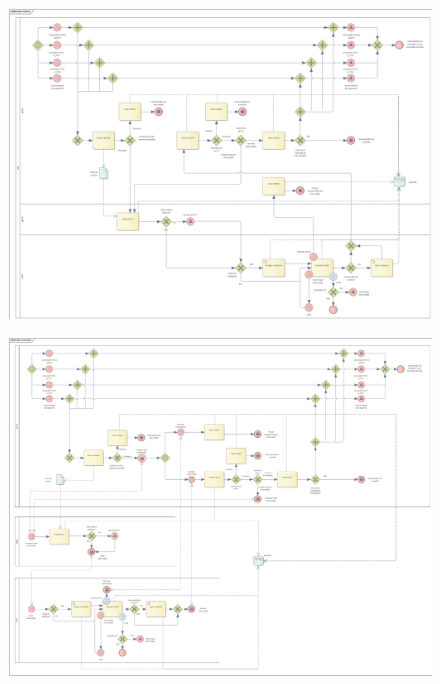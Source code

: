 \documentclass{article}
\begin{document}
    \pagebreak
    \begin{figure}[H]
        \centering
        \vspace*{-1.4cm}
        \hspace*{-1.2cm}
        \includegraphics[angle=-90,origin=c, scale=0.50]{BPMN_One_Pool.png}
    \end{figure}
%
    \pagebreak
    \begin{figure}[H]
        \centering
        \vspace*{-1.4cm}
        \hspace*{-1.8cm}
        \includegraphics[angle=-90,origin=c, scale=0.45]{BPMN_Various_Pools.png}
    \end{figure}
\end{document}
